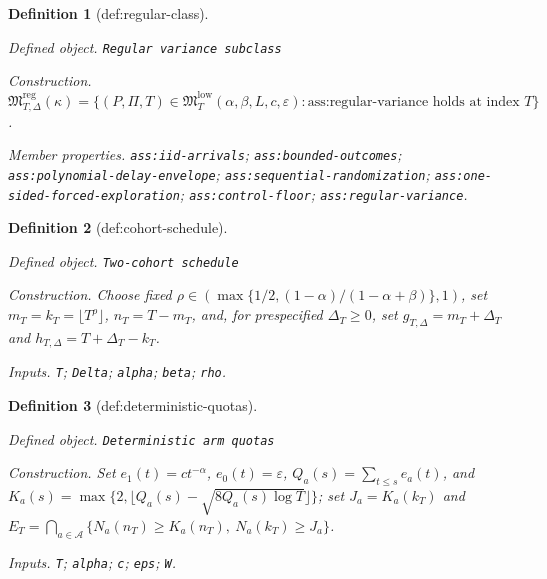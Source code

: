 \documentclass{article}
\newtheorem{definition}{Definition}
\begin{document}
\begin{definition}[def:regular-class]\label{def:regular-class}
\par\smallskip\noindent\emph{Defined object.} \texttt{Regular variance subclass}
\par\smallskip\noindent\emph{Construction.} \(\mathfrak M_{T,\Delta}^{\mathrm{reg}}(\kappa)=\{(P,\Pi,T)\in\mathfrak M_T^{\mathrm{low}}(\alpha,\beta,L,c,\varepsilon):\text{ass:regular-variance holds at index }T\}\).
\par\smallskip\noindent\emph{Member properties.} \texttt{ass:\allowbreak{}iid-\allowbreak{}arrivals}; \texttt{ass:\allowbreak{}bounded-\allowbreak{}outcomes}; \texttt{ass:\allowbreak{}polynomial-\allowbreak{}delay-\allowbreak{}envelope}; \texttt{ass:\allowbreak{}sequential-\allowbreak{}randomization}; \texttt{ass:\allowbreak{}one-\allowbreak{}sided-\allowbreak{}forced-\allowbreak{}exploration}; \texttt{ass:\allowbreak{}control-\allowbreak{}floor}; \texttt{ass:\allowbreak{}regular-\allowbreak{}variance}.
\end{definition}

\begin{definition}[def:cohort-schedule]\label{def:cohort-schedule}
\par\smallskip\noindent\emph{Defined object.} \texttt{Two-\allowbreak{}cohort schedule}
\par\smallskip\noindent\emph{Construction.} Choose fixed \(\rho\in(\max\{1/2,(1-\alpha)/(1-\alpha+\beta)\},1)\), set \(m_T=k_T=\lfloor T^\rho\rfloor\), \(n_T=T-m_T\), and, for prespecified \(\Delta_T\geq0\), set \(g_{T,\Delta}=m_T+\Delta_T\) and \(h_{T,\Delta}=T+\Delta_T-k_T\).
\par\smallskip\noindent\emph{Inputs.} \texttt{T}; \texttt{Delta}; \texttt{alpha}; \texttt{beta}; \texttt{rho}.
\end{definition}

\begin{definition}[def:deterministic-quotas]\label{def:deterministic-quotas}
\par\smallskip\noindent\emph{Defined object.} \texttt{Deterministic arm quotas}
\par\smallskip\noindent\emph{Construction.} Set \(e_1(t)=ct^{-\alpha}\), \(e_0(t)=\varepsilon\), \(Q_a(s)=\sum_{t\leq s}e_a(t)\), and \(K_a(s)=\max\{2,\lfloor Q_a(s)-\sqrt{8Q_a(s)\log T}\rfloor\}\); set \(J_a=K_a(k_T)\) and \(E_T=\bigcap_{a\in\mathcal A}\{N_a(n_T)\geq K_a(n_T),\ N_a(k_T)\geq J_a\}\).
\par\smallskip\noindent\emph{Inputs.} \texttt{T}; \texttt{alpha}; \texttt{c}; \texttt{eps}; \texttt{W}.
\end{definition}
\end{document}
